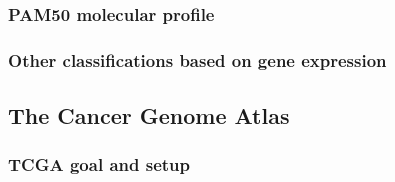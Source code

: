     \subsubsection{PAM50 molecular profile}

    \subsubsection{Other classifications based on gene expression }

        
    \newpage    
    \subsection{The Cancer Genome Atlas}
        \subsubsection{TCGA goal and setup}

